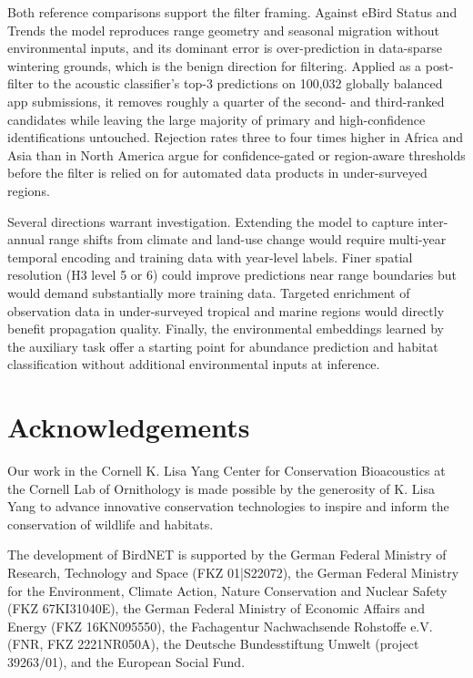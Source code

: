 Both reference comparisons support the filter framing. Against eBird Status and Trends the model reproduces range geometry and seasonal migration without environmental inputs, and its dominant error is over-prediction in data-sparse wintering grounds, which is the benign direction for filtering. Applied as a post-filter to the acoustic classifier's top-3 predictions on 100,032 globally balanced app submissions, it removes roughly a quarter of the second- and third-ranked candidates while leaving the large majority of primary and high-confidence identifications untouched. Rejection rates three to four times higher in Africa and Asia than in North America argue for confidence-gated or region-aware thresholds before the filter is relied on for automated data products in under-surveyed regions.

Several directions warrant investigation. Extending the model to capture inter-annual range shifts from climate and land-use change would require multi-year temporal encoding and training data with year-level labels. Finer spatial resolution (H3 level 5 or 6) could improve predictions near range boundaries but would demand substantially more training data. Targeted enrichment of observation data in under-surveyed tropical and marine regions would directly benefit propagation quality. Finally, the environmental embeddings learned by the auxiliary task offer a starting point for abundance prediction and habitat classification without additional environmental inputs at inference.

\pagebreak
\section{Acknowledgements}
\label{sec:acknowledgements}

Our work in the Cornell K. Lisa Yang Center for Conservation Bioacoustics at the Cornell Lab of Ornithology is made possible by the generosity of K. Lisa Yang to advance innovative conservation technologies to inspire and inform the conservation of wildlife and habitats.

The development of BirdNET is supported by the German Federal Ministry of Research, Technology and Space (FKZ 01|S22072), the German Federal Ministry for the Environment, Climate Action, Nature Conservation and Nuclear Safety (FKZ 67KI31040E), the German Federal Ministry of Economic Affairs and Energy (FKZ 16KN095550), the Fachagentur Nachwachsende Rohstoffe e.V. (FNR, FKZ 2221NR050A), the Deutsche Bundesstiftung Umwelt (project 39263/01), and the European Social Fund.

